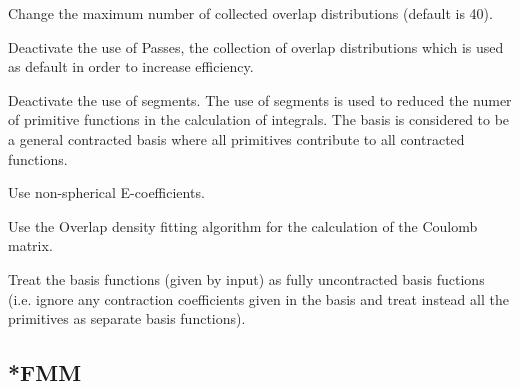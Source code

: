 \begin{description}
Change the maximum number of collected overlap distributions (default is 40).
\item[\Key{NO PASS}] Deactivate the use of Passes, the collection of overlap distributions which is used as default in order to increase efficiency. 
\item[\Key{NOSEGMENT}] Deactivate the use of segments. The use of segments is used to reduced the numer of primitive functions in the calculation of integrals. The basis is considered to be a general contracted basis where all primitives contribute to all contracted functions. 
\item[\Key{NSETUV}] Use non-spherical E-coefficients.
\item[\Key{OVERLAP-DF-J}] Use the Overlap density fitting algorithm for the calculation of the Coulomb matrix.
\item[\Key{UNCONT}] Treat the basis functions (given by input) as fully uncontracted basis fuctions (i.e. ignore
any contraction coefficients given in the basis and treat instead all the primitives as separate basis functions).
\end{description}

\subsection{*FMM}\label{subsec:denfit}

